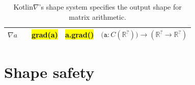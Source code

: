 \documentclass[12pt,initial,twoside,maitrise]{dms}
\newcommand{\inline}[1]{%
    \begingroup%
    \sethlcolor{slightgray}%
    \hl{\ttfamily\small #1}%
    \endgroup
}
\newcommand{\tinline}[1]{%
    \begingroup%
    \sethlcolor{slightgray}%
    \hl{\ttfamily\tiny #1}%
    \endgroup
}
\numberwithin{equation}{section}
\numberwithin{table}{chapter}
\numberwithin{figure}{chapter}
\begin{document}
{\begin{table}
\begin{tabular}{|c|c|c|c|l|}
               $\nabla a$                                      &                                                                                  & \tinline{grad(a)}                                                                         & \tinline{a.grad()}                                                                           & $                   \big(\texttt{a}: C(\mathbb{R}^{?})\big) \rightarrow (\mathbb{R}^{?}\rightarrow\mathbb{R}^{?})                                                                                          $ \\ \hline
    \end{tabular}
\caption{\label{tab:shape_system}Kotlin$\nabla$'s shape system specifies the output shape for matrix arithmetic.}
\end{table}
}

\section{Shape safety}\label{sec:shape-safety}
\end{document}

